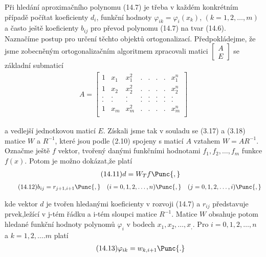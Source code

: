Při  hledání aproximačního polynomu (14.7) je třeba v každém
konkrétním případě počítat koeficienty $d_i$, funkční hodnoty
$\varphi_{ik} = \varphi_i(x_k)$, $(k=1,2,\ldots,m)$ a často ještě
koeficienty $b_{ij}$ pro převod polynomu (14.7) na tvar
(14.6). Naznačíme postup pro určení těchto objektů
ortogonalizací. Předpokládejme, že jsme zobecněným ortogonalizačním
algoritmem zpracovali matici $\left[
\begin{array}{c} A \\ E
\end{array}
\right]$
se základní submaticí
%
\begin{align*}
\tag{14.10}
A =
\left[
\begin{array}{cccccccc}
1 & x_1 & x_1^2 & . & . & . & . & x_1^n \\
1 & x_2 & x_2^2 & . & . & . & . & x_2^n \\
. & .   & .     & . & . & . & . & .    \\
. & .   & .     & . & . & . & . & .    \\
1 & x_m & x_m^2 & . & . & . & . & x_m^n \\
\end{array}
\right]
\end{align*}

\noindent
a vedlejší jednotkovou maticí $E$. Získali jsme tak v souladu se
(3.17) a (3.18) matice $W$ a $R^{-1}$, které jsou podle (2.10) spojeny
s maticí $A$ vztahem $W = AR^{-1}$. Označme ještě $f$ vektor, tvořený
danými funkčními hodnotami $f_1,f_2,\ldots,f_m$ funkce $f(x)$. Potom je
možno dokázat,že platí
%
\begin{align*}
        \tag{14.11}
        d = W_Tf\Punc{,}
\end{align*}
%
\begin{align*}
        \tag{14.12}
        b_{ij} = r_{j+1,i+1}\Punc{,} \quad
        (i=0,1,2,\ldots,n)\Punc{,} \quad
        (j=0,1,2,\ldots,i)\Punc{,}
\end{align*}

\noindent
kde vektor $d$ je tvořen hledanými koeficienty v rozvoji (14.7)
a $r_{ij}$ představuje prvek,ležící v j-tém řádku a i-tém sloupci
matice $R^{-1}$. Matice $W$ obsahuje potom hledané funkční hodnoty
polynomů $\varphi_i$ v bodech $x_1, x_2, \ldots, x_,$.
Pro $i=0,1,2,\ldots,n$ a $k=1,2,\ldots.m$ platí
%
\begin{align*}
   \tag{14.13}
   \varphi_{ik} = w_{k,i+1}\Punc{.}
\end{align*}
